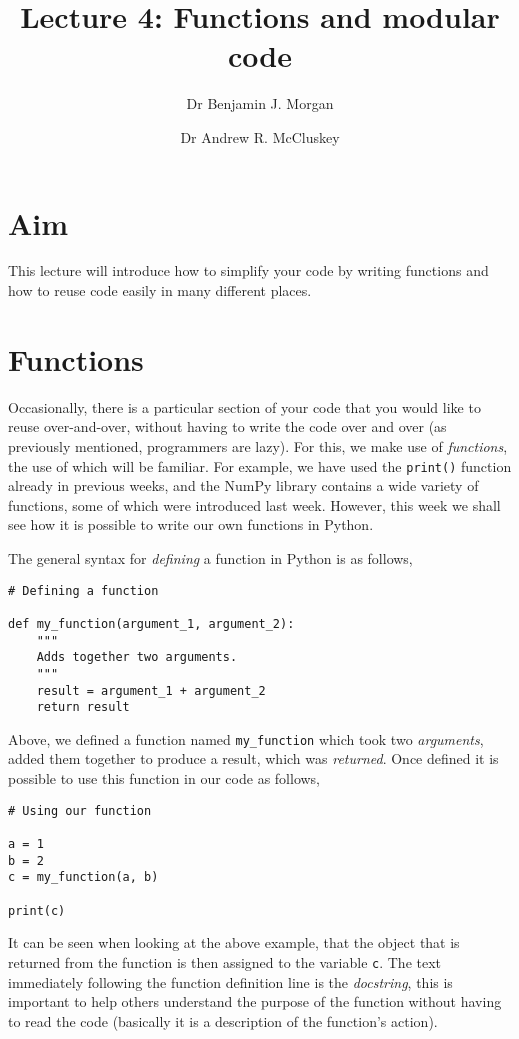 \documentclass[a4paper]{article}
\title{Lecture 4: Functions and modular code}
\author[1]{Dr Benjamin J. Morgan}
\author[1,2]{Dr Andrew R. McCluskey}
\affil[1]{Department of Chemistry, University of Bath, email: b.j.morgan@bath.ac.uk}
\affil[2]{Diamond Light Source, email: andrew.mccluskey@diamond.ac.uk}
\begin{document}
\maketitle

\section*{Aim}
This lecture will introduce how to simplify your code by writing functions and how to reuse code easily in many different places.

\section{Functions}

Occasionally, there is a particular section of your code that you would like to reuse over-and-over, without having to write the code over and over (as previously mentioned, programmers are lazy).
For this, we make use of \emph{functions}, the use of which will be familiar.
For example, we have used the \texttt{print()} function already in previous weeks, and the NumPy library contains a wide variety of functions, some of which were introduced last week.
However, this week we shall see how it is possible to write our own functions in Python.

The general syntax for \emph{defining} a function in Python is as follows,
\begin{lstlisting}
# Defining a function

def my_function(argument_1, argument_2):
    """
    Adds together two arguments.
    """
    result = argument_1 + argument_2
    return result
\end{lstlisting}
Above, we defined a function named \texttt{my\_function} which took two \emph{arguments}, added them together to produce a result, which was \emph{returned}.
Once defined it is possible to use this function in our code as follows,
\begin{lstlisting}
# Using our function

a = 1
b = 2
c = my_function(a, b)

print(c)
\end{lstlisting}
It can be seen when looking at the above example, that the object that is returned from the function is then assigned to the variable \texttt{c}.
The text immediately following the function definition line is the \emph{docstring}, this is important to help others understand the purpose of the function without having to read the code (basically it is a description of the function's action).
\end{document}

